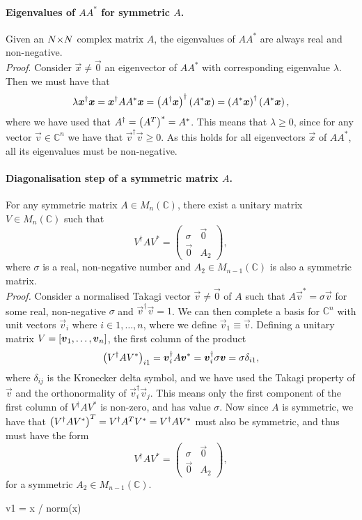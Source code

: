 \documentclass[../main.tex]{subfiles}
\begin{document}
\paragraph{Eigenvalues of \(AA^\ast\) for symmetric \(A\).}
Given an \(N {\times} N\) complex matrix \(A\), the eigenvalues of \(AA^\ast\) are always real and non-negative.\\
\emph{Proof}.
Consider \(\vec{x} \neq \vec{0}\) an eigenvector of \(AA^\ast\) with corresponding eigenvalue \(\lambda\).
Then we must have that
\[\lambda \boldsymbol{x}^\dagger \boldsymbol{x} = \boldsymbol{x}^\dagger AA^\ast \boldsymbol{x} = \left(A^\dagger \boldsymbol{x}\right)^\dagger \left(A^\ast \boldsymbol{x}\right) = \left(A^\ast \boldsymbol{x}\right)^\dagger \left(A^\ast \boldsymbol{x}\right),\]
where we have used that \(A^\dagger = \left(A^T\right)^\ast = A^\ast\).
This means that \(\lambda \geq 0\), since for any vector \(\vec{v} \in \mathbb{C}^n\) we have that \(\vec{v}^\dagger \vec{v} \geq 0\).
As this holds for all eigenvectors \(\vec{x}\) of \(AA^\ast\), all its eigenvalues must be non-negative.

\paragraph{Diagonalisation step of a symmetric matrix \(A\).}
For any symmetric matrix \(A \in M_n(\mathbb{C})\), there exist a unitary matrix \(V \in M_n(\mathbb{C})\) such that
\[V^\dagger A V^\ast = \begin{pmatrix} \sigma & \vec{0} \\ \vec{0} & A_2 \end{pmatrix},\]
where \(\sigma\) is a real, non-negative number and \(A_2 \in M_{n-1}(\mathbb{C})\) is also a symmetric matrix. \\
\emph{Proof.}
Consider a normalised Takagi vector \(\vec{v} \neq \vec{0}\) of \(A\) such that \(A\vec{v}^\ast = \sigma \vec{v}\) for some real, non-negative \(\sigma\) and \(\vec{v}^\dagger \vec{v} = 1\).
We can then complete a basis for \(\mathbb{C}^n\) with unit vectors \(\vec{v}_i\) where \(i \in 1, \ldots, n\), where we define \(\vec{v}_1 \equiv \vec{v}\).
Defining a unitary matrix \(V = \left[\boldsymbol{v}_1, \ldots, \boldsymbol{v}_{n}\right]\), the first column of the product
\[\left(V^\dagger A V^\ast\right)_{i1} = \boldsymbol{v}_i^\dagger A \boldsymbol{v}^* = \boldsymbol{v}_i^\dagger \sigma \boldsymbol{v} = \sigma \delta_{i1},\]
where \(\delta_{ij}\) is the Kronecker delta symbol, and we have used the Takagi property of \(\vec{v}\) and the orthonormality of \(\vec{v}_i^\dagger \vec{v}_j\).
This means only the first component of the first column of \(V^\dagger A V^\ast\) is non-zero, and has value \(\sigma\).
Now since \(A\) is symmetric, we have that
\(\left(V^\dagger A V^\ast\right)^T = V^\dagger A^T V^\ast = V^\dagger A V^\ast\)
must also be symmetric, and thus must have the form
\[V^\dagger A V^\ast = \begin{pmatrix} \sigma & \vec{0} \\ \vec{0} & A_2 \end{pmatrix},\]
for a symmetric \(A_2 \in M_{n-1}(\mathbb{C})\).

\begin{algorithm}
  \begin{algorithmic}
    \State v1 = x / norm(x)
    \EndIf
  \end{algorithmic}
  \caption{}
  \label{app:alg:takagi}
\end{algorithm}

% 
\end{document}

